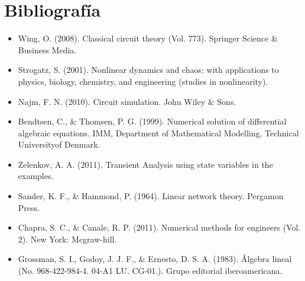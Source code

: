 \documentclass[10pt,a4paper]{article} %
\begin{document}
	\section{Bibliografía}
	\begin{itemize}
		\item	Wing, O. (2008). Classical circuit theory (Vol. 773). Springer Science \& Business Media.
		\item Strogatz, S. (2001). Nonlinear dynamics and chaos: with applications to physics, biology, chemistry, and engineering (studies in nonlinearity).
		\item  Najm, F. N. (2010). Circuit simulation. John Wiley \& Sons.
		\item Bendtsen, C., \& Thomsen, P. G. (1999). Numerical solution of differential algebraic equations. IMM, Department of Mathematical Modelling, Technical Universityof Denmark.
		\item Zelenkov, A. A. (2011). Transient Analysis using state variables in the examples.
		\item Sander, K. F., \& Hammond, P. (1964). Linear network theory. Pergamon Press.
		\item Chapra, S. C., \& Canale, R. P. (2011). Numerical methods for engineers (Vol. 2). New York: Mcgraw-hill.
		\item Grossman, S. I., Godoy, J. J. F., \& Ernesto, D. S. A. (1983). Álgebra lineal (No. 968-422-984-4. 04-A1 LU. CG-01.). Grupo editorial iberoamericana.
	\end{itemize}
\end{document}
